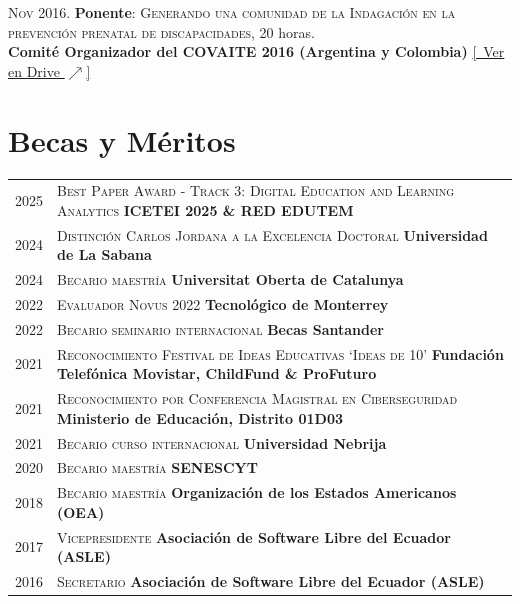 \documentclass[a4paper]{article}
\begin{document}
\textsc{Nov} 2016. \textbf{Ponente}: \textsc{Generando una comunidad de la Indagación en la prevención prenatal de discapacidades}, 20 horas.\\
\textbf{Comité Organizador del COVAITE 2016 (Argentina y Colombia)} \small \href{https://drive.google.com/file/d/15a4oq7zohCoRocSE6JLeNIV7S27XThw8/view}{[\faGoogleDrive~Ver en Drive $\nearrow$]} \\[4pt]





\section{Becas y Méritos}
\begin{longtable}{r|p{12.2cm}}
\textsc{2025}  & \textsc{Best Paper Award - Track 3: Digital Education and Learning Analytics} \textbf{ICETEI 2025 \& RED EDUTEM} \\
\textsc{2024}  & \textsc{Distinción Carlos Jordana a la Excelencia Doctoral} \textbf{Universidad de La Sabana} \\
\textsc{2024}  & \textsc{Becario maestría} \textbf{Universitat Oberta de Catalunya} \\
\textsc{2022}  & \textsc{Evaluador Novus 2022} \textbf{Tecnológico de Monterrey} \\
\textsc{2022}  & \textsc{Becario seminario internacional} \textbf{Becas Santander} \\
\textsc{2021}  & \textsc{Reconocimiento Festival de Ideas Educativas `Ideas de 10'} \textbf{Fundación Telefónica Movistar, ChildFund \& ProFuturo} \\
\textsc{2021}  & \textsc{Reconocimiento por Conferencia Magistral en Ciberseguridad} \textbf{Ministerio de Educación, Distrito 01D03} \\
\textsc{2021}  & \textsc{Becario curso internacional} \textbf{Universidad Nebrija} \\
\textsc{2020}  & \textsc{Becario maestría} \textbf{SENESCYT} \\
\textsc{2018}  & \textsc{Becario maestría} \textbf{Organización de los Estados Americanos (OEA)} \\
\textsc{2017}  & \textsc{Vicepresidente} \textbf{Asociación de Software Libre del Ecuador (ASLE)} \\
\textsc{2016}  & \textsc{Secretario} \textbf{Asociación de Software Libre del Ecuador (ASLE)} \\
\end{longtable}
\end{document}
